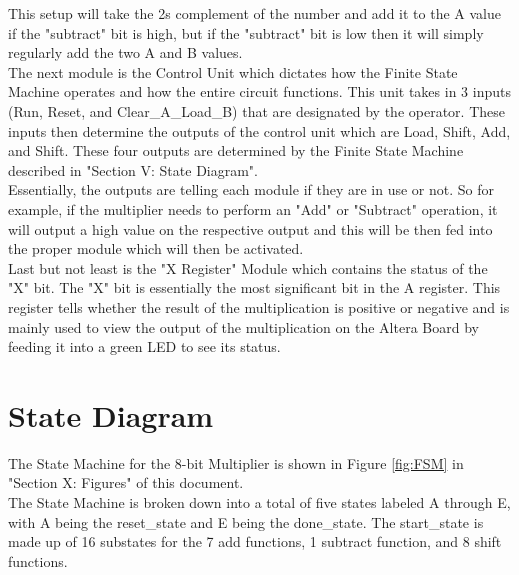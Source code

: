 \documentclass[journal, twocolumn, final,11pt,letterpaper]{IEEEtran}
\begin{document}
This setup will take the 2s complement of the number and add it to the A value if the "subtract" bit is high, but if the "subtract" bit is low then it will simply regularly add the two A and B values. \\

The next module is the Control Unit which dictates how the Finite State Machine operates and how the entire circuit functions. This unit takes in 3 inputs (Run, Reset, and Clear\_A\_Load\_B) that are designated by the operator. These inputs then determine the outputs of the control unit which are Load, Shift, Add, and Shift. These four outputs are determined by the Finite State Machine described in "Section V: State Diagram".\\

 Essentially, the outputs are telling each module if they are in use or not. So for example, if the multiplier needs to perform an "Add" or "Subtract" operation, it will output a high value on the respective output and this will be then fed into the proper module which will then be activated. \\

Last but not least is the "X Register" Module which contains the status of the "X" bit. The "X" bit is essentially the most significant bit in the A register. This register tells whether the result of the multiplication is positive or negative and is mainly used to view the output of the multiplication on the Altera Board by feeding it into a green LED to see its status. 

\section{State Diagram}
The State Machine for the 8-bit Multiplier is shown in Figure \ref{fig:FSM} in "Section X: Figures" of this document.  \\

The State Machine is broken down into a total of five states labeled A through E, with A being the reset\_state and E being the done\_state. The start\_state is made up of 16 substates for the 7 add functions, 1 subtract function, and 8 shift functions.  

\end{document}
